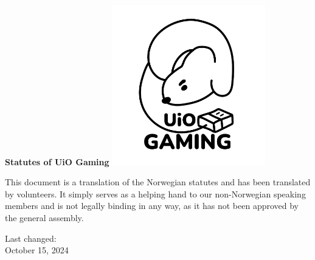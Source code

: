 \begin{titlepage}
\begin{center}
    \vspace*{1cm}

    \Huge
    \textbf{Statutes of UiO Gaming}
    \vspace{1cm}
    \vspace{3cm}
    \includegraphics[width=0.5\textwidth]{images/2024_logo_svart.png}
    \vspace{3cm}


    \small{This document is a translation of the Norwegian statutes and has been translated by volunteers. It simply serves as a helping hand to our non-Norwegian speaking members and is not legally binding in any way, as it has not been approved by the general assembly.}
    \vspace{3cm}

    \LARGE
    Last changed:\\
    October 15, 2024
\end{center}
\end{titlepage}